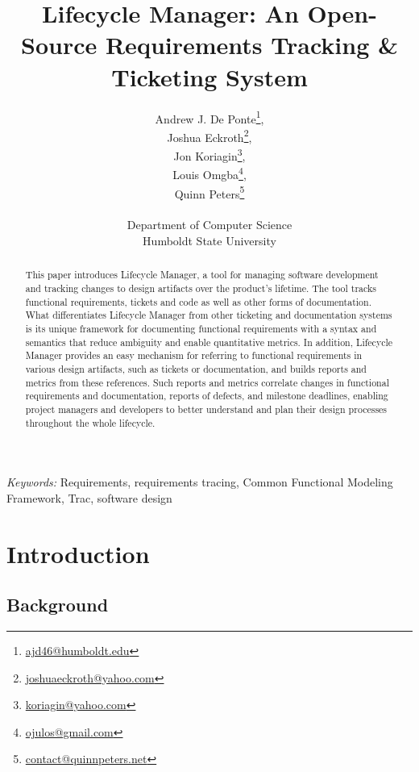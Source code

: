 \documentclass[letterpaper,10pt]{article}
\title{Lifecycle Manager: An Open-Source Requirements Tracking \& Ticketing System}
\author{
  Andrew J. De Ponte\footnote{\href{mailto:ajd46@humboldt.edu}{ajd46@humboldt.edu}}, \\
  Joshua Eckroth\footnote{\href{mailto:joshuaeckroth@yahoo.com}{joshuaeckroth@yahoo.com}}, \\
  Jon Koriagin\footnote{\href{mailto:koriagin@yahoo.com}{koriagin@yahoo.com}}, \\
  Louis Omgba\footnote{\href{mailto:ojulos@gmail.com}{ojulos@gmail.com}}, \\
  Quinn Peters\footnote{\href{mailto:contact@quinnpeters.net}{contact@quinnpeters.net}} \\
  \\
  Department of Computer Science\\
  Humboldt State University}
\date{}
\begin{document}
	
	
        \maketitle
			
        \begin{abstract}
          This paper introduces Lifecycle Manager, a tool for managing
          software development and tracking changes to design
          artifacts over the product's lifetime. The tool tracks
          functional requirements, tickets and code as well as other
          forms of documentation. What differentiates Lifecycle
          Manager from other ticketing and documentation systems is
          its unique framework for documenting functional requirements
          with a syntax and semantics that reduce ambiguity and
          enable quantitative metrics. In addition, Lifecycle Manager
          provides an easy mechanism for referring to functional
          requirements in various design artifacts, such as tickets or
          documentation, and builds reports and metrics from these
          references. Such reports and metrics correlate changes in
          functional requirements and documentation, reports of
          defects, and milestone deadlines, enabling project managers
          and developers to better understand and plan their design
          processes throughout the whole lifecycle.
        \end{abstract}
        
        {\parindent 0pt \footnotesize \emph{Keywords:} Requirements, requirements tracing, Common Functional Modeling Framework, Trac, software design}
        
        \vspace{.1in}
        
	\section{Introduction}

        \subsection{Background}
\end{document}
